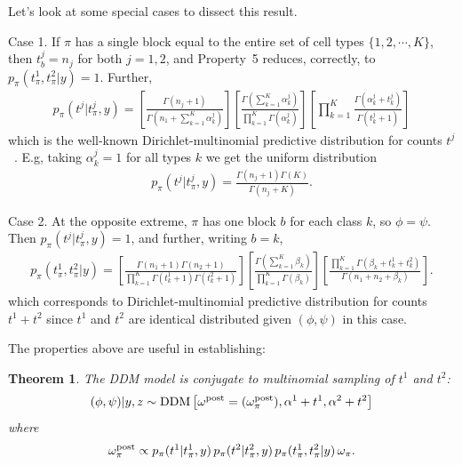 \documentclass[aoas,preprint]{imsart}
\newtheorem{theorem}{Theorem}
\begin{document}
Let's look at some special cases to dissect this result. 

Case 1. If $\pi$ has a single block equal to the entire
 set of cell types $\{1,2, \cdots, K\}$,  then $t^j_b=n_j$ for both $j=1,2$,
and Property~5 reduces, correctly, to 
$p_\pi(t^1_{\pi},t^2_{\pi}| y) = 1$.  Further,
\begin{eqnarray*}
p_\pi(t^j | t^j_{\pi},y) = 
\left[ \frac{ \Gamma(n_j +1 ) }{ \Gamma( n_1 + \sum_{k=1}^K \alpha_k^j ) }
\right]
\left[ \frac{\Gamma( \sum_{k =1}^K \alpha_k^j )}{
                \prod_{k=1}^K \Gamma( \alpha_k^j ) } \right]
       \left[    \prod_{k=1}^K    \frac{  \Gamma(\alpha_k^j + t^j_k)}{
                \Gamma(t^j_k + 1 )}\right]
\end{eqnarray*}
which is the well-known Dirichlet-multinomial predictive distribution
for counts $t^j$~\citep{Wag}.  E.g, taking $\alpha_k^j=1$ for all types $k$ 
we get the uniform distribution
\begin{eqnarray*}
p_\pi(t^j | t^j_{\pi},y) = 
 \frac{ \Gamma(n_j +1 ) \Gamma(K) }{ \Gamma( n_j + K ) }.
\end{eqnarray*}

Case 2. At the opposite extreme, $\pi$  has one block $b$ for each
 class $k$, so $\phi=\psi$. Then $p_\pi(t^j | t^j_{\pi},y) = 1$, and 
further, writing $b = k$,
\begin{eqnarray*}
p_\pi(t^1_{\pi},t^2_{\pi}|y ) =
 \left[ \frac{ \Gamma(n_1+1) \Gamma(n_2+1) }{ \prod_{k=1}^K 
   \Gamma(t^1_k+1) 
   \Gamma( t^2_k + 1 )} \right] 
\left[ \frac{\Gamma( \sum_{k=1}^K \beta_k  )}{
   \prod_{k=1}^K \Gamma(\beta_k)} \right] 
 \left[ \frac{ \prod_{k=1}^K \Gamma( \beta_k + t^1_k + t^2_k )}{
	\Gamma( n_1 + n_2 + \beta_k  )} \right].
\end{eqnarray*}
which corresponds to Dirichlet-multinomial predictive distribution for counts $t^1 + t^2$ 
since $t^1$ and $t^2$ are identical distributed given $(\phi,\psi)$ in this case.


The properties above are useful in establishing:
\begin{theorem}
The DDM model is conjugate to multinomial sampling of $t^1$ and $t^2$:
\begin{eqnarray*}
(\phi,\psi)|y,z  \sim {\mbox {\rm DDM}}\left[ \omega^{\rm post}=(\omega^{\rm post}_\pi), \alpha^1 + t^1, \alpha^2 + t^2  \right]
\end{eqnarray*}
where
\begin{eqnarray*}
\omega^{\rm post}_\pi \propto 
 p_\pi(t^1 | t^1_{\pi},y)\, p_\pi(t^2|  t^2_{\pi},y )
 \, p_\pi( t^1_{\pi}, t^2_{\pi} | y ) \, \omega_\pi.
\end{eqnarray*}

\end{theorem}
\end{document}
